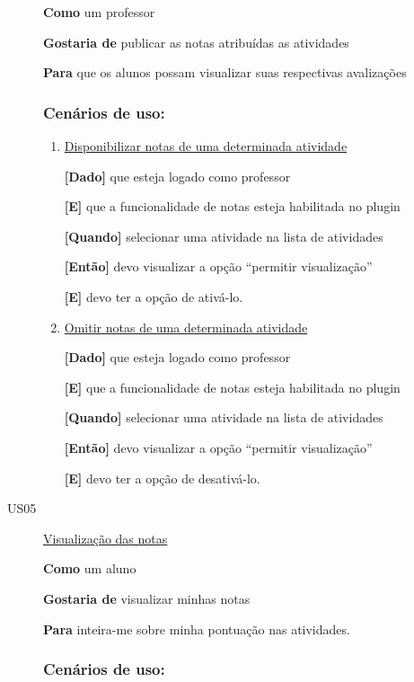 \begin{description}
\textbf{Como} um professor

\textbf{Gostaria de} publicar as notas atribuídas as atividades

\textbf{Para} que os alunos possam visualizar suas respectivas avalizações

\subsubsection*{Cenários de uso:}

\begin{enumerate}
\item \underline{Disponibilizar notas de uma determinada atividade}

\textbf{[Dado]} que esteja logado como professor

\textbf{[E]} que a funcionalidade de notas esteja habilitada no plugin

\textbf{[Quando]} selecionar uma atividade na lista de atividades

\textbf{[Então]} devo visualizar a opção ``permitir visualização''

\textbf{[E]} devo ter a opção de ativá-lo.

\item \underline{Omitir notas de uma determinada atividade}

\textbf{[Dado]} que esteja logado como professor

\textbf{[E]} que a funcionalidade de notas esteja habilitada no plugin

\textbf{[Quando]} selecionar uma atividade na lista de atividades

\textbf{[Então]} devo visualizar a opção ``permitir visualização''

\textbf{[E]} devo ter a opção de desativá-lo.

\end{enumerate}

\item [US05\label{us05}]\underline{Visualização das notas}

\textbf{Como} um aluno

\textbf{Gostaria de} visualizar minhas notas

\textbf{Para} inteira-me sobre minha pontuação nas atividades.

\subsubsection*{Cenários de uso:}
\begin{enumerate}


\end{enumerate}
\end{description}
